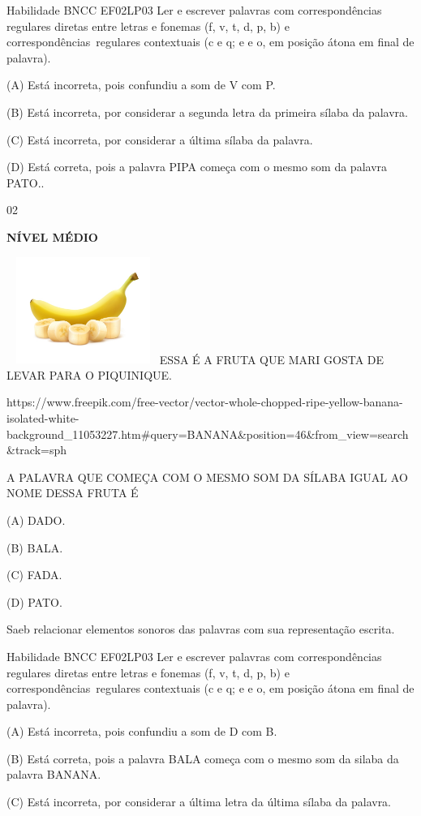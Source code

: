 {{Habilidade BNCC EF02LP03 Ler e escrever palavras com correspondências
regulares diretas entre letras e fonemas (f, v, t, d, p, b) e
correspondências~regulares contextuais (c e q; e e o, em posição átona
em final de palavra).

(A) Está incorreta, pois confundiu a som de V com P.

(B) Está incorreta, por considerar a segunda letra da primeira sílaba da
palavra.

(C) Está incorreta, por considerar a última sílaba da palavra.

(D) Está correta, pois a palavra PIPA começa com o mesmo som da palavra
PATO..

\num{02}

\textbf{NÍVEL MÉDIO}

\includegraphics[width=1.96704in,height=1.37153in]{media/image175.jpeg}ESSA
É A FRUTA QUE MARI GOSTA DE LEVAR PARA O PIQUINIQUE.

https://www.freepik.com/free-vector/vector-whole-chopped-ripe-yellow-banana-isolated-white-background\_11053227.htm\#query=BANANA\&position=46\&from\_view=search\&track=sph

A PALAVRA QUE COMEÇA COM O MESMO SOM DA SÍLABA IGUAL AO NOME DESSA FRUTA
É

(A) DADO.

(B) BALA.

(C) FADA.

(D) PATO.

Saeb relacionar elementos sonoros das palavras com sua representação
escrita.

Habilidade BNCC EF02LP03 Ler e escrever palavras com correspondências
regulares diretas entre letras e fonemas (f, v, t, d, p, b) e
correspondências~regulares contextuais (c e q; e e o, em posição átona
em final de palavra).

(A) Está incorreta, pois confundiu a som de D com B.

(B) Está correta, pois a palavra BALA começa com o mesmo som da silaba
da palavra BANANA.

(C) Está incorreta, por considerar a última letra da última sílaba da
palavra.

}}
